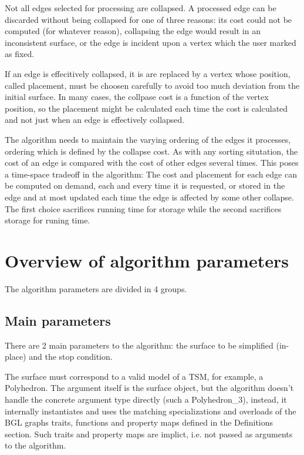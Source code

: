 Not all edges selected for processing are collapsed. A processed edge can be discarded without being collapsed for one of three reasons: its cost could not be computed (for whatever reason), collapsing the edge would result in an inconsistent surface, or the edge is incident upon a vertex which the user marked as fixed.

If an edge is effecitively collapsed, it is are replaced by a vertex whose position, called placement, must be choosen carefully to avoid too much deviation from the initial surface. In many cases, the collpase cost is a function of the vertex position, so the placement might be calculated each time the cost is calculated and not just when an edge is effectively collapsed.

The algorithm needs to maintain the varying ordering of the edges it processes, ordering which is defined by the collapse cost. As with any sorting situtation, the cost of an edge is compared with the cost of other edges several times. This poses a time-space tradeoff in the algorithm: The cost and placement for each edge can be computed on demand, each and every time it is requested, or stored in the edge and at most updated each time the edge is affected by some other collapse. The first choice sacrifices running time for storage while the second sacrifices storage for runing time. 

\section{Overview of algorithm parameters}

The algorithm parameters are divided in 4 groups.

\subsection{Main parameters}

There are 2 main parameters to the algorithm: the surface to be simplified (in-place) and the stop condition.

The surface must correspond to a valid model of a TSM, for example, a Polyhedron. The argument itself is the surface object, but the algorithm doesn't handle the concrete argument type directly (such a Polyhedron\_3), instead, it internally instantiates and uses the matching specializations and overloads of the BGL graphs traits, functions and property maps defined in the Definitions section. Such traits and property maps are implict, i.e. not passed as arguments to the algorithm.

